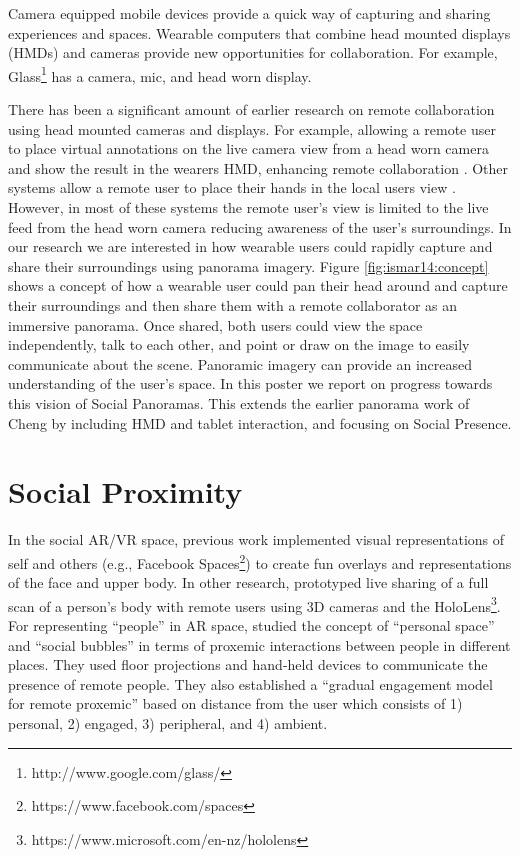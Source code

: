 Camera equipped mobile devices provide a quick way of capturing and sharing experiences and spaces. Wearable
computers that combine head mounted displays (HMDs) and cameras provide new opportunities for collaboration. For example, Glass\footnote{http://www.google.com/glass/} has a camera, mic, and head worn display.



There has been a significant amount of earlier research on remote collaboration using head mounted cameras and displays. For example, allowing a remote user to place virtual annotations on the live camera view from a head worn camera and show the result in the wearers HMD, enhancing remote collaboration \cite{Fussell2003}. Other systems allow a remote user to place their hands in the local users view \cite{Huang2013}. However, in most of these systems the remote user's view is limited to the live feed from the head worn camera reducing awareness of the user's surroundings. In our research we are interested in how wearable users could rapidly capture and share their surroundings using panorama imagery. Figure \ref{fig:ismar14:concept} shows a concept of how a wearable user could pan their head around and capture their surroundings and then share them with a remote collaborator as an immersive panorama. Once shared, both users could view the space independently, talk to each other, and point or draw on the image to easily communicate about the scene. Panoramic imagery can provide an increased understanding of the user's space. In this poster we report on progress towards this vision of Social Panoramas. This extends the earlier panorama work of Cheng \cite{L.Cheng1998} by including HMD and tablet interaction, and focusing on Social Presence.

\section{Social Proximity}

In the social AR/VR space, previous work implemented visual representations of self and others (e.g., Facebook Spaces\footnote{https://www.facebook.com/spaces}) to create fun overlays and representations of the face and upper body. In other research, \cite{Fanello2016} prototyped live sharing of a full scan of a person's body with remote users using 3D cameras and the HoloLens\footnote{https://www.microsoft.com/en-nz/hololens}. For representing “people” in AR space, \cite{Sousa2016} studied the concept of \enquote{personal space} and \enquote{social bubbles} in terms of proxemic interactions between people in different places. They used floor projections and hand-held devices to communicate the presence of remote people. They also established a \enquote{gradual engagement model for remote proxemic} based on distance from the user which consists of 1) personal, 2) engaged, 3) peripheral, and 4) ambient.

